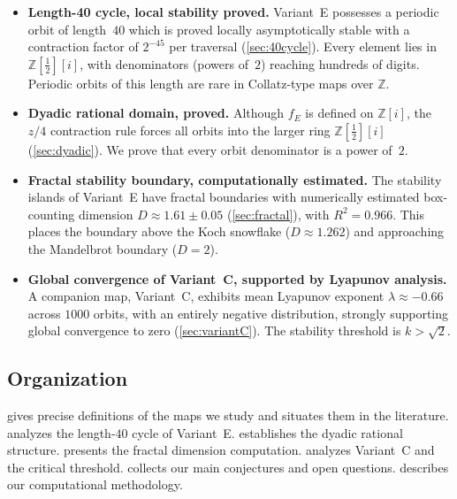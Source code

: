 \documentclass[12pt]{article}
\theoremstyle{plain}
\theoremstyle{definition}
\theoremstyle{remark}
\theoremstyle{definition}
\newcommand{\Z}{\mathbb{Z}}
\newcommand{\Zi}{\mathbb{Z}[i]}
\begin{document}
\begin{itemize}
    \item \textbf{Length-40 cycle, local stability proved.}
          Variant~E possesses a periodic orbit of length~$40$
          which is proved locally asymptotically stable with a contraction
          factor of $2^{-45}$ per traversal (\cref{sec:40cycle}).
          Every element lies in $\Z[\tfrac{1}{2}][i]$,
          with denominators (powers of~$2$) reaching hundreds of
          digits. Periodic orbits of this length are rare in
          Collatz-type maps over $\Z$.

    \item \textbf{Dyadic rational domain, proved.}
          Although $f_E$ is defined on $\Zi$, the $z/4$ contraction
          rule forces all orbits into the larger ring
          $\Z[\tfrac{1}{2}][i]$ (\cref{sec:dyadic}).
          We prove that every orbit denominator is a power of~$2$.

    \item \textbf{Fractal stability boundary, computationally estimated.}
          The stability islands of Variant~E have fractal boundaries
          with numerically estimated box-counting dimension $D \approx 1.61 \pm 0.05$
          (\cref{sec:fractal}), with $R^2 = 0.966$.
          This places the boundary above the Koch snowflake
          ($D \approx 1.262$) and approaching the Mandelbrot
          boundary ($D = 2$).

    \item \textbf{Global convergence of Variant~C, supported by
          Lyapunov analysis.}
          A companion map, Variant~C, exhibits mean Lyapunov
          exponent $\lambda \approx -0.66$ across $1000$ orbits,
          with an entirely negative distribution, strongly
          supporting global convergence to zero
          (\cref{sec:variantC}).
          The stability threshold is $k > \sqrt{2}$.
\end{itemize}

\subsection*{Organization}

 gives precise definitions of the maps we
study and situates them in the literature.
 analyzes the length-$40$ cycle of Variant~E.
 establishes the dyadic rational structure.
 presents the fractal dimension computation.
 analyzes Variant~C and the critical threshold.
 collects our main conjectures and open
questions.
 describes our computational methodology.
\end{document}
